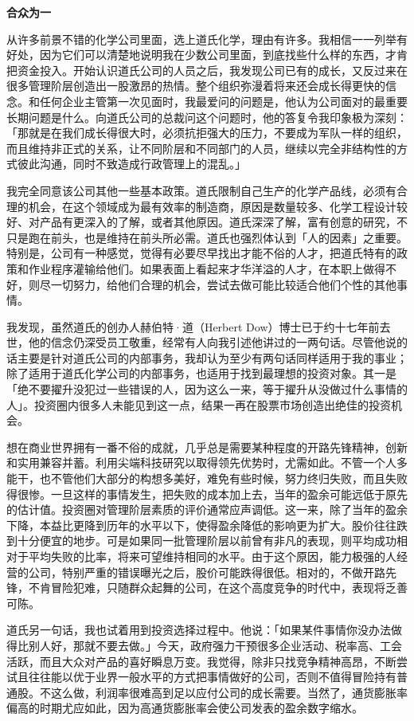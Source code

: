 \documentclass[UTF8,a4paper,zihao=-4,fontset = windows]{ctexart} %
\begin{document}
\textbf{合众为一}


从许多前景不错的化学公司里面，选上道氏化学，理由有许多。我相信一一列举有好处，因为它们可以清楚地说明我在少数公司里面，到底找些什么样的东西，才肯把资金投入。开始认识道氏公司的人员之后，我发现公司已有的成长，又反过来在很多管理阶层创造出一股激昂的热情。整个组织弥漫着将来还会成长得更快的信念。和任何企业主管第一次见面时，我最爱问的问题是，他认为公司面对的最重要长期问题是什么。向道氏公司的总裁问这个问题时，他的答复令我印象极为深刻：「那就是在我们成长得很大时，必须抗拒强大的压力，不要成为军队一样的组织，而且维持非正式的关系，让不同阶层和不同部门的人员，继续以完全非结构性的方式彼此沟通，同时不致造成行政管理上的混乱。」

我完全同意该公司其他一些基本政策。道氏限制自己生产的化学产品线，必须有合理的机会，在这个领域成为最有效率的制造商，原因是数量较多、化学工程设计较好、对产品有更深入的了解，或者其他原因。道氏深深了解，富有创意的研究，不只是跑在前头，也是维持在前头所必需。道氏也强烈体认到「人的因素」之重要。特别是，公司有一种感觉，觉得有必要尽早找出才能不俗的人才，把道氏特有的政策和作业程序灌输给他们。如果表面上看起来才华洋溢的人才，在本职上做得不好，则尽一切努力，给他们合理的机会，尝试去做可能比较适合他们个性的其他事情。

我发现，虽然道氏的创办人赫伯特·道（Herbert Dow）博士已于约十七年前去世，他的信念仍深受员工敬重，经常有人向我引述他讲过的一两句话。尽管他说的话主要是针对道氏公司的内部事务，我却认为至少有两句话同样适用于我的事业；除了适用于道氏化学公司的内部事务，也适用于找到最理想的投资对象。其一是「绝不要擢升没犯过一些错误的人，因为这么一来，等于擢升从没做过什么事情的人」。投资圈内很多人未能见到这一点，结果一再在股票市场创造出绝佳的投资机会。

想在商业世界拥有一番不俗的成就，几乎总是需要某种程度的开路先锋精神，创新和实用兼容并蓄。利用尖端科技研究以取得领先优势时，尤需如此。不管一个人多能干，也不管他们大部分的构想多美好，难免有些时候，努力终归失败，而且失败得很惨。一旦这样的事情发生，把失败的成本加上去，当年的盈余可能远低于原先的估计值。投资圈对管理阶层素质的评价通常应声调低。这一来，除了当年的盈余下降，本益比更降到历年的水平以下，使得盈余降低的影响更为扩大。股价往往跌到十分便宜的地步。可是如果同一批管理阶层以前曾有非凡的表现，则平均成功相对于平均失败的比率，将来可望维持相同的水平。由于这个原因，能力极强的人经营的公司，特别严重的错误曝光之后，股价可能跌得很低。相对的，不做开路先锋，不肯冒险犯难，只随群众起舞的公司，在这个高度竞争的时代中，表现将乏善可陈。

道氏另一句话，我也试着用到投资选择过程中。他说：「如果某件事情你没办法做得比别人好，那就不要去做。」今天，政府强力干预很多企业活动、税率高、工会活跃，而且大众对产品的喜好瞬息万变。我觉得，除非只找竞争精神高昂，不断尝试且往往能以优于业界一般水平的方式把事情做好的公司，否则不值得冒险持有普通股。不这么做，利润率很难高到足以应付公司的成长需要。当然了，通货膨胀率偏高的时期尤应如此，因为高通货膨胀率会使公司发表的盈余数字缩水。
\\
\end{document}
